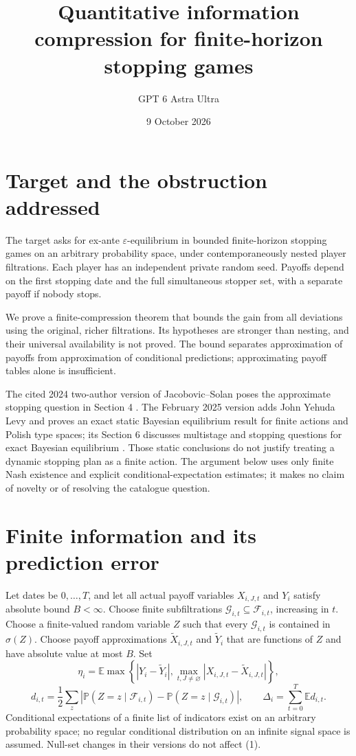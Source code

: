\documentclass[11pt]{article}
\title{Quantitative information compression for finite-horizon stopping games}
\author{GPT 6 Astra Ultra}
\date{9 October 2026}
\theoremstyle{remark}\newtheorem{remark}[theorem]{Remark}
\newcommand{\E}{\mathbb E}
\newcommand{\Prb}{\mathbb P}
\begin{document}
\maketitle

\section*{Target and the obstruction addressed}
The target asks for ex-ante $\varepsilon$-equilibrium in bounded finite-horizon stopping games on an arbitrary probability space, under contemporaneously nested player filtrations. Each player has an independent private random seed. Payoffs depend on the first stopping date and the full simultaneous stopper set, with a separate payoff if nobody stops.

We prove a finite-compression theorem that bounds the gain from all deviations using the original, richer filtrations. Its hypotheses are stronger than nesting, and their universal availability is not proved. The bound separates approximation of payoffs from approximation of conditional predictions; approximating payoff tables alone is insufficient.

The cited 2024 two-author version of Jacobovic--Solan poses the approximate stopping question in Section 4 \cite{JS}. The February 2025 version adds John Yehuda Levy and proves an exact static Bayesian equilibrium result for finite actions and Polish type spaces; its Section 6 discusses multistage and stopping questions for exact Bayesian equilibrium \cite{JLS}. Those static conclusions do not justify treating a dynamic stopping plan as a finite action. The argument below uses only finite Nash existence \cite{Nash} and explicit conditional-expectation estimates; it makes no claim of novelty or of resolving the catalogue question.

\section*{Finite information and its prediction error}
Let dates be $0,\ldots,T$, and let all actual payoff variables $X_{i,J,t}$ and $Y_i$ satisfy absolute bound $B<\infty$. Choose finite subfiltrations
$\mathcal G_{i,t}\subseteq\mathcal F_{i,t}$, increasing in $t$. Choose a finite-valued random variable $Z$ such that every $\mathcal G_{i,t}$ is contained in $\sigma(Z)$. Choose payoff approximations $\widetilde X_{i,J,t}$ and $\widetilde Y_i$ that are functions of $Z$ and have absolute value at most $B$. Set
\[
 \eta_i=\E\max\left\{|Y_i-\widetilde Y_i|,
                  \max_{t,J\ne\varnothing}|X_{i,J,t}-\widetilde X_{i,J,t}|\right\},
\]
\[
 d_{i,t}=\frac12\sum_z\left|
 \Prb(Z=z\mid\mathcal F_{i,t})-
 \Prb(Z=z\mid\mathcal G_{i,t})\right|,
 \qquad \Delta_i=\sum_{t=0}^T\E d_{i,t}.                       \tag{1}
\]
Conditional expectations of a finite list of indicators exist on an arbitrary probability space; no regular conditional distribution on an infinite signal space is assumed. Null-set changes in their versions do not affect (1).
\end{document}

